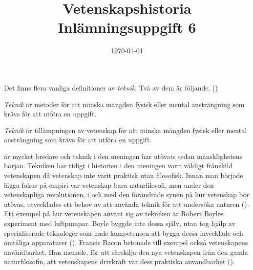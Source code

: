 

\title{Vetenskapshistoria Inlämningsuppgift 6}
\author{}
\date{\today}

\usepackage{times}
\linespread{1.5}


\maketitle



Det finns flera vanliga definitioner av \emph{teknik}. Två av dem är följande.  (\cite[s.\ 24--27]{Lundgren2017})
\begin{definition}\label{def:teknik_definition_gammal}
	\emph{Teknik} är metoder för att minska mängden fysisk eller mental ansträngning som krävs för att utföra en uppgift.
\end{definition}
\begin{definition}\label{def:teknik_definition_ny}
	\emph{Teknik} är tillämpningen av vetenskap för att minska mängden fysisk eller mental ansträngning som krävs för att utföra en uppgift.
\end{definition}
 är mycket bredare och teknik i den meningen har utövats sedan mänsklighetens början. Tekniken har tidigt i historien i den meningen varit väldigt frånskild vetenskapen då vetenskap inte varit praktisk utan filosofisk. Innan man började lägga fokus på empiri var vetenskap bara naturfilosofi, men under den vetenskapliga revolutionen, i och med den förändrade synen på hur vetenskap bör utövas, utvecklades ett behov av att använda teknik för att undersöka naturen (\cite[kap.\ 2]{Bowler2005}). Ett exempel på hur vetenskapen använt sig av tekniken är Robert Boyles experiment med luftpumpar. Boyle byggde inte dessa själv, utan tog hjälp av specialiserade teknologer som hade kompetensen att bygga dessa invecklade och ömtåliga apparaturer (\cite[s.\ 407--412]{Bowler2005}). Francis Bacon betonade till exempel också vetenskapens användbarhet. Han menade, för att särskilja den nya vetenskapen från den gamla naturfilosofin, att vetenskapens drivkraft var dess praktiska användbarhet (\cite[s.\ 395]{Bowler2005}).

